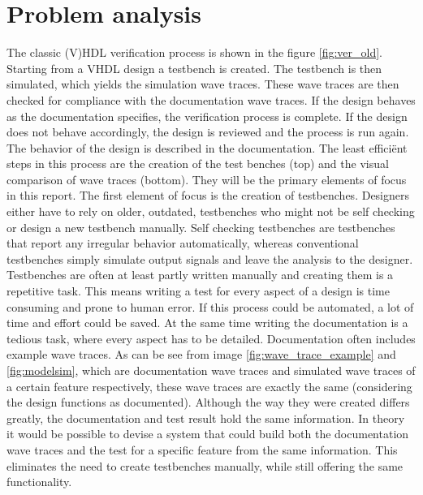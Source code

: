 
\chapter{Problem analysis}%
The classic (V)HDL verification process is shown in the figure \ref{fig:ver_old}. Starting from a VHDL design a testbench is created. The testbench is then simulated, which yields the simulation wave traces. These wave traces are then checked for compliance with the documentation wave traces. If the design behaves as the documentation specifies, the verification process is complete. If the design does not behave accordingly, the design is reviewed and the process is run again. The behavior of the design is described in the documentation.
\npar
The least efficiënt steps in this process are the creation of the test benches (top) and the visual comparison of wave traces (bottom). They will be the primary elements of focus in this report.
\npar
The first element of focus is the creation of testbenches. Designers either have to rely on older, outdated, testbenches who might not be self checking or design a new testbench manually. Self checking testbenches are testbenches that report any irregular behavior automatically, whereas conventional testbenches simply simulate output signals and leave the analysis to the designer. Testbenches are often at least partly written manually and creating them is a repetitive task. This means writing a test for every aspect of a design is time consuming and prone to human error. If this process could be automated, a lot of time and effort could be saved. At the same time writing the documentation is a tedious task, where every aspect has to be detailed. Documentation often includes example wave traces. As can be see from image \ref{fig:wave_trace_example} and \ref{fig:modelsim}, which are documentation wave traces and simulated wave traces of a certain feature respectively, these wave traces are exactly the same (considering the design functions as documented). Although the way they were created differs greatly, the documentation and test result hold the same information. In theory it would be possible to devise a system that could build both the documentation wave traces and the test for a specific feature from the same information. This eliminates the need to create testbenches manually, while still offering the same functionality.%
